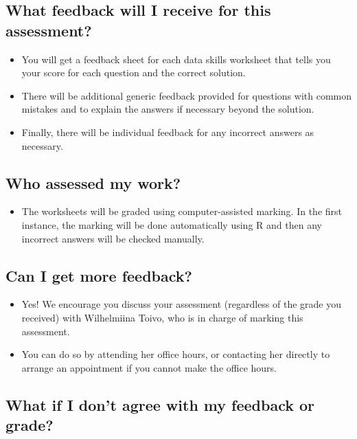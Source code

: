 \documentclass[
  english,
  letterpaper,
  DIV=11,
  numbers=noendperiod]{scrreprt}
\providecommand{\tightlist}{%
  \setlength{\itemsep}{0pt}\setlength{\parskip}{0pt}}
\begin{document}
\subsection{What feedback will I receive for this
assessment?}\label{what-feedback-will-i-receive-for-this-assessment}

\begin{itemize}
\item
  You will get a feedback sheet for each data skills worksheet that
  tells you your score for each question and the correct solution.
\item
  There will be additional generic feedback provided for questions with
  common mistakes and to explain the answers if necessary beyond the
  solution.
\item
  Finally, there will be individual feedback for any incorrect answers
  as necessary.
\end{itemize}

\subsection{Who assessed my work?}\label{who-assessed-my-work}

\begin{itemize}
\tightlist
\item
  The worksheets will be graded using computer-assisted marking. In the
  first instance, the marking will be done automatically using R and
  then any incorrect answers will be checked manually.
\end{itemize}

\subsection{Can I get more feedback?}\label{can-i-get-more-feedback}

\begin{itemize}
\item
  Yes! We encourage you discuss your assessment (regardless of the grade
  you received) with Wilhelmiina Toivo, who is in charge of marking this
  assessment.
\item
  You can do so by attending her office hours, or contacting her
  directly to arrange an appointment if you cannot make the office
  hours.
\end{itemize}

\subsection{What if I don't agree with my feedback or
grade?}\label{what-if-i-dont-agree-with-my-feedback-or-grade}
\end{document}
